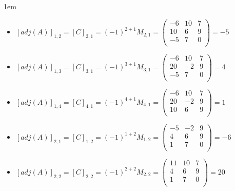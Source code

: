 \documentclass[12pt, fleqn]{article}                             %
\newenvironment{SmallIndentation}[1][0.75em]                    %
        {\begin{adjustwidth}{#1}{}\begin{footnotesize}}             %
        {\end{footnotesize}\end{adjustwidth}}                       %
\theoremstyle{break}                                            %
\newcommand{\pVector}[1]                                        %
        { \ensuremath{\begin{pmatrix}#1\end{pmatrix}} }             %
\begin{document}
\begin{itemize}
\begin{SmallIndentation}[1em]
\begin{itemize}
                    \item
                        $[adj(A)]_{1, 2} 
                            = [C]_{2, 1} 
                            = (-1)^{2+1} M_{2, 1}
                            = \pVector{
                                    -6 & 10 & 7   \\ 
                                    10 & 6 & 9    \\
                                    -5 & 7 & 0    \\
                                }
                            = -5$

                    \item
                        $[adj(A)]_{1, 3} 
                            = [C]_{3, 1} 
                            = (-1)^{3+1} M_{3, 1}
                            = \pVector{
                                    -6 & 10 & 7   \\ 
                                    20 & -2 & 9   \\
                                    -5 & 7 & 0    \\
                                }
                            = 4$

                    \item
                        $[adj(A)]_{1, 4} 
                            = [C]_{4, 1} 
                            = (-1)^{4+1} M_{4, 1}
                            = \pVector{
                                    -6 & 10 & 7   \\ 
                                    20 & -2 & 9   \\
                                    10 & 6 & 9    \\
                                }
                            = 1$

                    \item
                        $[adj(A)]_{2, 1} 
                            = [C]_{1, 2} 
                            = (-1)^{1+2} M_{1, 2}
                            = \pVector{
                                    -5 & -2 & 9   \\
                                    4  & 6 & 9    \\
                                    1  & 7 & 0    \\
                                }
                            = -6$

                    \item
                        $[adj(A)]_{2, 2} 
                            = [C]_{2, 2} 
                            = (-1)^{2+2} M_{2, 2}
                            = \pVector{
                                    11 & 10 & 7   \\ 
                                    4  & 6 & 9    \\
                                    1  & 7 & 0    \\
                                }
                            = 20$


\end{itemize}
\end{SmallIndentation}
\end{itemize}
\end{document}
